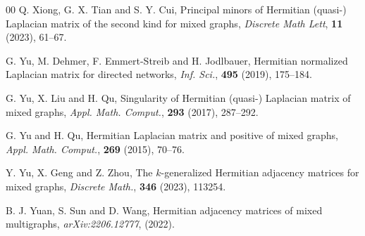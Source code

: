 \documentclass[12pt]{article}
\numberwithin{equation}{section}
\begin{document}
\begin{thebibliography}{00}
		 Q. Xiong, G. X. Tian and S. Y. Cui, Principal minors of Hermitian (quasi-) Laplacian matrix of the second kind for mixed graphs, \textit{Discrete Math Lett}, \textbf{11} (2023), 61--67.
		
		 G. Yu, M. Dehmer, F. Emmert-Streib and H. Jodlbauer, Hermitian normalized Laplacian matrix for directed networks, \textit{Inf. Sci.}, \textbf{495} (2019), 175--184.
		
		G. Yu, X. Liu and H. Qu, Singularity of Hermitian (quasi-) Laplacian matrix of mixed graphs, \textit{Appl. Math. Comput.}, \textbf{293} (2017), 287--292.
		
		G. Yu and  H. Qu, Hermitian Laplacian matrix and positive of mixed graphs, \textit{Appl. Math. Comput.}, \textbf{269} (2015), 70--76.
		
		Y. Yu, X. Geng and Z. Zhou, The $k$-generalized Hermitian adjacency matrices for mixed graphs, \textit{Discrete Math.}, \textbf{346} (2023), 113254.
		
		 B. J. Yuan, S. Sun and D. Wang, Hermitian adjacency matrices of mixed multigraphs, \textit{arXiv:2206.12777},  (2022).
		
		
		
		
	\end{thebibliography}
\end{document}
